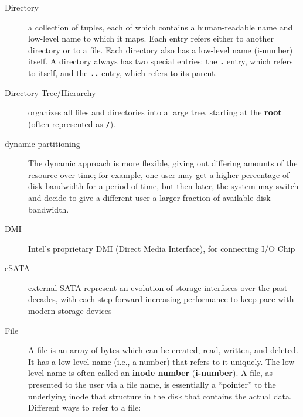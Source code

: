 \begin{description}
\item[Directory] a collection of tuples, each of which contains a human-readable name and low-level name to which it maps. Each entry refers either to another directory or to a file. Each directory also has a low-level name (i-number) itself. A directory always has two special entries: the \textbf{\texttt{.}} entry, which refers to itself, and the \textbf{\texttt{..}} entry, which refers to its parent.

\item[Directory Tree/Hierarchy] organizes all files and directories into a large tree, starting at the \textbf{root} (often represented as \texttt{/}).

\item[dynamic partitioning] The dynamic approach is more flexible, giving out differing amounts of the resource over time; for example, one user may get a higher percentage of disk bandwidth for a period of time, but then later, the system may switch and decide to give a different user a larger fraction of available disk bandwidth.

\item[DMI]  Intel’s proprietary DMI (Direct Media Interface), for connecting I/O Chip

\item[eSATA] external SATA represent an evolution of storage interfaces over the past decades, with each step forward increasing performance to keep pace with modern storage devices

\item[File] A file is an array of bytes which can be created, read, written, and deleted. It has a low-level name (i.e., a number) that refers to it uniquely. The low-level name is often called an \textbf{inode number} (\textbf{i-number}).  A file, as presented to the user via a file name, is essentially a “pointer” to the underlying inode that structure in the disk that contains the actual data. Different ways to refer to a file:


\end{description}
